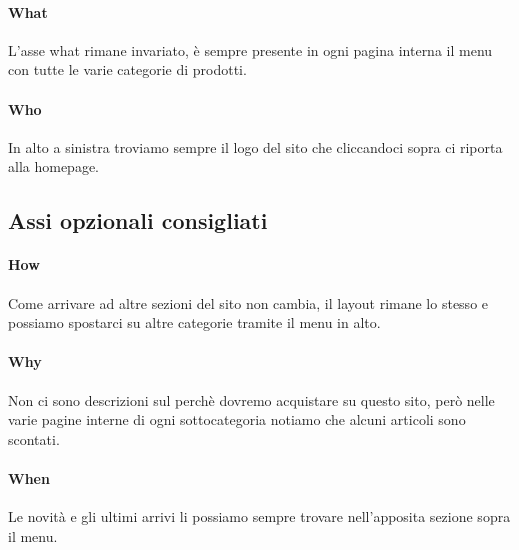 \documentclass[12pt]{article}
\begin{document}
	\paragraph{What} L'asse what rimane invariato, è sempre presente in ogni pagina interna il menu con tutte le varie categorie di prodotti.
	\paragraph{Who} In alto a sinistra troviamo sempre il logo del sito che cliccandoci sopra ci riporta alla homepage.
	\\
	\subsection{Assi opzionali consigliati}
	\vspace{0.5cm}
	\paragraph{How} Come arrivare ad altre sezioni del sito non cambia, il layout rimane lo stesso e possiamo spostarci su altre categorie tramite il menu in alto.
	\paragraph{Why} Non ci sono descrizioni sul perchè dovremo acquistare su questo sito, però nelle varie pagine interne di ogni sottocategoria notiamo che alcuni articoli sono scontati.
	\paragraph{When} Le novità e gli ultimi arrivi li possiamo sempre trovare nell'apposita sezione sopra il menu.
	\newpage
\end{document}
